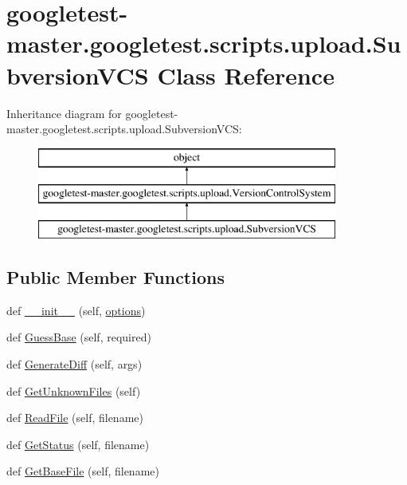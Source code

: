 \hypertarget{classgoogletest-master_1_1googletest_1_1scripts_1_1upload_1_1_subversion_v_c_s}{}\section{googletest-\/master.googletest.\+scripts.\+upload.\+Subversion\+V\+CS Class Reference}
\label{classgoogletest-master_1_1googletest_1_1scripts_1_1upload_1_1_subversion_v_c_s}
Inheritance diagram for googletest-\/master.googletest.\+scripts.\+upload.\+Subversion\+V\+CS\+:\begin{figure}[H]
\begin{center}
\leavevmode
\includegraphics[height=3.000000cm]{d7/d69/classgoogletest-master_1_1googletest_1_1scripts_1_1upload_1_1_subversion_v_c_s}
\end{center}
\end{figure}
\subsection*{Public Member Functions}
\begin{DoxyCompactItemize}
\item 
def \mbox{\hyperlink{classgoogletest-master_1_1googletest_1_1scripts_1_1upload_1_1_subversion_v_c_s_af7b67fa318df02166babb35cc4d71605}{\+\_\+\+\_\+init\+\_\+\+\_\+}} (self, \mbox{\hyperlink{classgoogletest-master_1_1googletest_1_1scripts_1_1upload_1_1_version_control_system_ad426345e0518e3ca15ca7e9284e45754}{options}})
\item 
def \mbox{\hyperlink{classgoogletest-master_1_1googletest_1_1scripts_1_1upload_1_1_subversion_v_c_s_a8209d02ac6980b4cf6fe415ac28b3625}{Guess\+Base}} (self, required)
\item 
def \mbox{\hyperlink{classgoogletest-master_1_1googletest_1_1scripts_1_1upload_1_1_subversion_v_c_s_a25547b2a1179651ca489cd24c05072df}{Generate\+Diff}} (self, args)
\item 
def \mbox{\hyperlink{classgoogletest-master_1_1googletest_1_1scripts_1_1upload_1_1_subversion_v_c_s_a626e361b781f4403b60fcf00a129a92a}{Get\+Unknown\+Files}} (self)
\item 
def \mbox{\hyperlink{classgoogletest-master_1_1googletest_1_1scripts_1_1upload_1_1_subversion_v_c_s_a4390eaf4cfc0a1c28e2c0f21cd0cedb7}{Read\+File}} (self, filename)
\item 
def \mbox{\hyperlink{classgoogletest-master_1_1googletest_1_1scripts_1_1upload_1_1_subversion_v_c_s_a8850adde722d2ab300a6fe569cdcfd9e}{Get\+Status}} (self, filename)
\item 
def \mbox{\hyperlink{classgoogletest-master_1_1googletest_1_1scripts_1_1upload_1_1_subversion_v_c_s_a6374a566b05895b119efb904440d65f6}{Get\+Base\+File}} (self, filename)
\end{DoxyCompactItemize}
